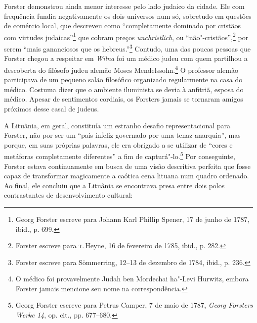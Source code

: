 Forster demonstrou ainda menor interesse pelo lado judaico
da cidade. Ele com frequência fundia negativamente os dois universos num
só, sobretudo em questões de comércio local, que descreveu como
``completamente dominado por cristãos com virtudes judaicas''\footnote{Georg Forster escreve para Johann Karl Phillip Spener, 17 de junho de 1787, ibid., p. 699.} que cobram preços \textit{unchristlich}, ou ``não"-cristãos'',\footnote{Forster escreve para \textsc{t}.\,Heyne, 16 de fevereiro de 1785, ibid., p. 282.} por serem ``mais gananciosos que os hebreus.''\footnote{Forster escreve para Sömmerring, 12--13 de dezembro de 1784, ibid., p. 236.} Contudo, uma das poucas pessoas que Forster chegou a respeitar em \textit{Wilna} foi um médico judeu com quem partilhou a
descoberta do filósofo judeu alemão Moses Mendelssohn.\footnote{O médico foi provavelmente Judah ben Mordechai ha"-Levi Hurwitz, embora Forster jamais mencione seu nome na correspondência.} O professor alemão participava de um pequeno salão filosófico organizado regularmente na
casa do médico. Costuma dizer que o ambiente iluminista se devia à
anfitriã, esposa do médico. Apesar de sentimentos cordiais, os Forsters
jamais se tornaram amigos próximos desse casal de judeus.

\asterisc

A Lituânia, em geral, constituía um estranho desafio representacional
para Forster, não por ser um ``país infeliz governado por uma tenaz
anarquia'', mas porque, em suas próprias palavras, ele era obrigado a se
utilizar de ``cores e metáforas completamente diferentes'' a fim de
capturá"-lo.\footnote{Georg Forster escreve para Petrus Camper, 7 de maio de 1787, \textit{Georg Forsters Werke 14}, op. cit., pp. 677--680.} Por conseguinte, Forster estava continuamente em busca de uma visão
descritiva perfeita que fosse capaz de transformar magicamente a caótica
cena lituana num quadro ordenado. Ao final, ele concluiu que a Lituânia
se encontrava presa entre dois polos contrastantes de desenvolvimento
cultural:

